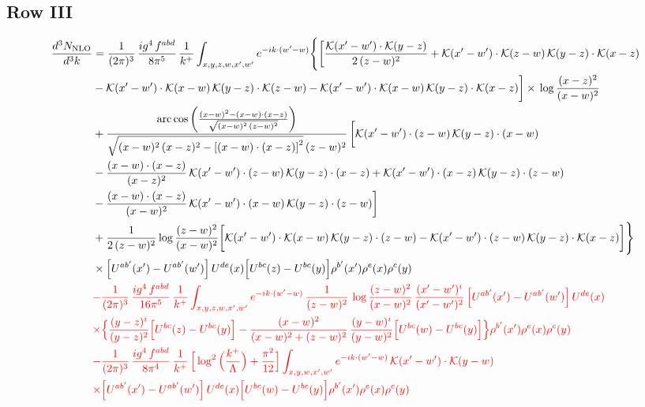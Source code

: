 \documentclass[9pt]{article}
\numberwithin{equation}{section}
\begin{document}
\subsection{Row III}
\begin{align}
\frac{d^{3}N_{\rm NLO}}{d^{3}k} &=\frac{1}{(2\pi)^{3}}\,\frac{ig^{4}\,f^{abd}}{8\pi^{5}}\,\frac{1}{k^{+}}\int_{x,y,z,w,x',w'}e^{-ik\cdot(w'-w)}\Bigg\{\bigg[\frac{\mathcal{K}(x'-w')\cdot\mathcal{K}(y-z)}{2\,(z-w)^{2}}+\mathcal{K}(x'-w')\cdot\mathcal{K}(z-w)\,\mathcal{K}(y-z)\cdot\mathcal{K}(x-z)\notag \\
&-\mathcal{K}(x'-w')\cdot\mathcal{K}(x-w)\,\mathcal{K}(y-z)\cdot\mathcal{K}(z-w)-\mathcal{K}(x'-w')\cdot\mathcal{K}(x-w)\,\mathcal{K}(y-z)\cdot\mathcal{K}(x-z)\bigg]\times\, \log\frac{(x-z)^{2}}{(x-w)^{2}}\notag \\
&+\frac{\mathrm{arc\,cos}\left(\frac{(x-w)^{2}-(x-w)\cdot (x-z)}{\sqrt{(x-w)^{2}\,(z-w)^{2}}}\right)}{\sqrt{(x-w)^{2}\,(x-z)^{2}-\left[(x-w)\cdot (x-z)\right]^{2}}\,(z-w)^{2}}\,\bigg[\mathcal{K}(x'-w')\cdot(z-w)\,\mathcal{K}(y-z)\cdot(x-w)\notag \\ & -\frac{(x-w)\cdot(x-z)}{(x-z)^{2}}\,\mathcal{K}(x'-w')\cdot(z-w)\,\mathcal{K}(y-z)\cdot(x-z)+\mathcal{K}(x'-w')\cdot(x-z)\,\mathcal{K}(y-z)\cdot(z-w)\notag \\ & -\frac{(x-w)\cdot(x-z)}{(x-w)^{2}}\,\mathcal{K}(x'-w')\cdot(x-w)\,\mathcal{K}(y-z)\cdot(z-w)\bigg]\notag \\
&+\frac{1}{2\,(z-w)^{2}}\log\frac{(z-w)^{2}}{(x-w)^{2}}\bigg[\mathcal{K}(x'-w')\cdot\mathcal{K}(x-w)\,\mathcal{K}(y-z)\cdot(z-w)-\mathcal{K}(x'-w')\cdot(z-w)\,\mathcal{K}(y-z)\cdot\mathcal{K}(x-z)\bigg]\Bigg\}\notag\\
&\times\Big[U^{ab'}(x')-U^{ab'}(w')\Big]\,U^{de}(x)\Big[U^{bc}(z)-U^{bc}(y)\Big]\rho^{b'}(x')\rho^{e}(x)\rho^{c}(y)\notag\\
&{\color{red}-\frac{1}{(2\pi)^{3}}\,\frac{ig^{4}\,f^{abd}}{16\pi^{5}}\,\frac{1}{k^{+}}\int_{x,y,z,w,x',w'}e^{-ik\cdot(w'-w)}\,\frac{1}{(z-w)^{2}}\,\log\frac{(z-w)^{2}}{(x-w)^{2}}\,\frac{(x'-w')^{i}}{(x'-w')^{2}}\,\Big[U^{ab'}(x')-U^{ab'}(w')\Big]\,U^{de}(x)}\notag\\
&{\color{red}\times\Big\{\frac{(y-z)^{i}}{(y-z)^{2}}\Big[U^{bc}(z)-U^{bc}(y)\Big]-\frac{(x-w)^{2}}{(x-w)^{2}+(z-w)^{2}}\,\frac{(y-w)^{i}}{(y-w)^{2}}\Big[U^{bc}(w)-U^{bc}(y)\Big]\Big\}\rho^{b'}(x')\rho^{e}(x)\rho^{c}(y)}\notag \\
&{\color{red}-\frac{1}{(2\pi)^{3}}\,\frac{ig^{4}\,f^{abd}}{8\pi^{4}}\,\frac{1}{k^{+}}\,\Big[\log^{2}\Big(\frac{k^{+}}{\Lambda}\Big)+\frac{\pi^{2}}{12}\Big]\int_{x,y,w,x',w'}e^{-ik\cdot(w'-w)}\,\mathcal{K}(x'-w')\cdot\mathcal{K}(y-w)}\notag\\
&{\color{red}\times\Big[U^{ab'}(x')-U^{ab'}(w')\Big]\,U^{de}(x)\Big[U^{bc}(w)-U^{bc}(y)\Big]\rho^{b'}(x')\rho^{e}(x)\rho^{c}(y)}
\end{align}
\end{document}

